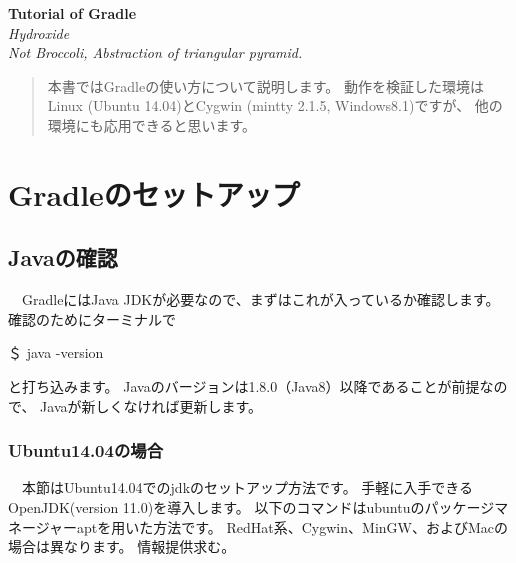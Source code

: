 \documentclass[a4paper,12pt]{article}
\begin{document}
\begin{center}
{\Large \bf Tutorial of Gradle \\[1.5em]}
{\it Hydroxide
} \\[0.5ex]
{\it Not Broccoli, Abstraction of triangular pyramid.
}
\end{center}
\quad \vspace{2ex}

\begin{abstract}

本書ではGradleの使い方について説明します。
動作を検証した環境はLinux (Ubuntu 14.04)とCygwin (mintty 2.1.5, Windows8.1)ですが、
他の環境にも応用できると思います。

\end{abstract}

\tableofcontents

\newpage

\section{Gradleのセットアップ}

\subsection{Javaの確認}

　GradleにはJava JDKが必要なので、まずはこれが入っているか確認します。
確認のためにターミナルで
\begin{shell}[Javaのバージョン確認]
＄ java -version
\end{shell}
と打ち込みます。
Javaのバージョンは1.8.0（Java8）以降であることが前提なので、
Javaが新しくなければ更新します。

\subsubsection{Ubuntu14.04の場合}
　本節はUbuntu14.04でのjdkのセットアップ方法です。
手軽に入手できるOpenJDK(version 11.0)を導入します。
以下のコマンドはubuntuのパッケージマネージャーaptを用いた方法です。
RedHat系、Cygwin、MinGW、およびMacの場合は異なります。
情報提供求む。
\end{document}
